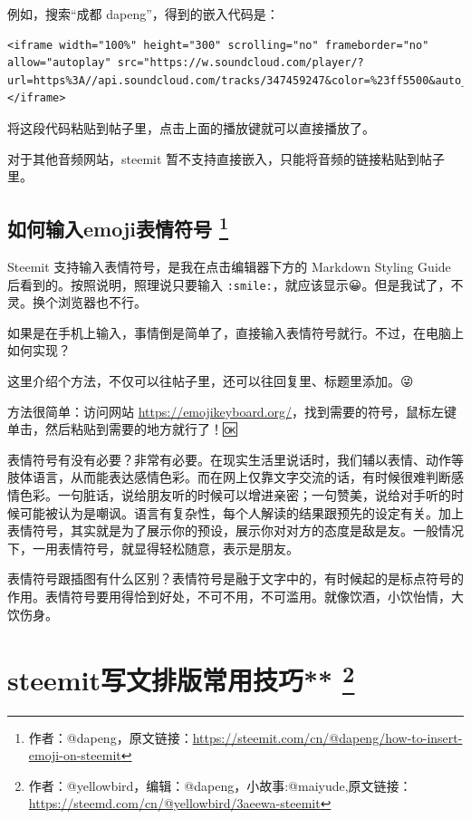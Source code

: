 \documentclass[]{ctexbook}
\begin{document}
例如，搜索``成都 dapeng''，得到的嵌入代码是：

\begin{verbatim}
<iframe width="100%" height="300" scrolling="no" frameborder="no" allow="autoplay" src="https://w.soundcloud.com/player/?url=https%3A//api.soundcloud.com/tracks/347459247&color=%23ff5500&auto_play=false&hide_related=false&show_comments=true&show_user=true&show_reposts=false&show_teaser=true&visual=true"></iframe>
\end{verbatim}

将这段代码粘贴到帖子里，点击上面的播放键就可以直接播放了。

对于其他音频网站，steemit 暂不支持直接嵌入，只能将音频的链接粘贴到帖子里。

\hypertarget{emoji}{%
\subsection[如何输入emoji表情符号 ]{\texorpdfstring{如何输入emoji表情符号 \footnote{作者：@dapeng，原文链接：\url{https://steemit.com/cn/@dapeng/how-to-insert-emoji-on-steemit}}}{如何输入emoji表情符号 }}\label{emoji}}

Steemit 支持输入表情符号，是我在点击编辑器下方的 Markdown Styling Guide 后看到的。按照说明，照理说只要输入 \texttt{:smile:}，就应该显示😀。但是我试了，不灵。换个浏览器也不行。🙁

如果是在手机上输入，事情倒是简单了，直接输入表情符号就行。不过，在电脑上如何实现？

这里介绍个方法，不仅可以往帖子里，还可以往回复里、标题里添加。😜

方法很简单：访问网站 \url{https://emojikeyboard.org/}，找到需要的符号，鼠标左键单击，然后粘贴到需要的地方就行了！🆗

表情符号有没有必要？非常有必要。在现实生活里说话时，我们辅以表情、动作等肢体语言，从而能表达感情色彩。而在网上仅靠文字交流的话，有时候很难判断感情色彩。一句脏话，说给朋友听的时候可以增进亲密；一句赞美，说给对手听的时候可能被认为是嘲讽。语言有复杂性，每个人解读的结果跟预先的设定有关。加上表情符号，其实就是为了展示你的预设，展示你对对方的态度是敌是友。一般情况下，一用表情符号，就显得轻松随意，表示是朋友。

表情符号跟插图有什么区别？表情符号是融于文字中的，有时候起的是标点符号的作用。表情符号要用得恰到好处，不可不用，不可滥用。就像饮酒，小饮怡情，大饮伤身。

\hypertarget{pbcyjq}{%
\section[steemit写文排版常用技巧** ]{\texorpdfstring{steemit写文排版常用技巧** \footnote{作者：@yellowbird，编辑：@dapeng，小故事:@maiyude,原文链接：\url{https://steemd.com/cn/@yellowbird/3aeewa-steemit}}}{steemit写文排版常用技巧** }}\label{pbcyjq}}
\end{document}
